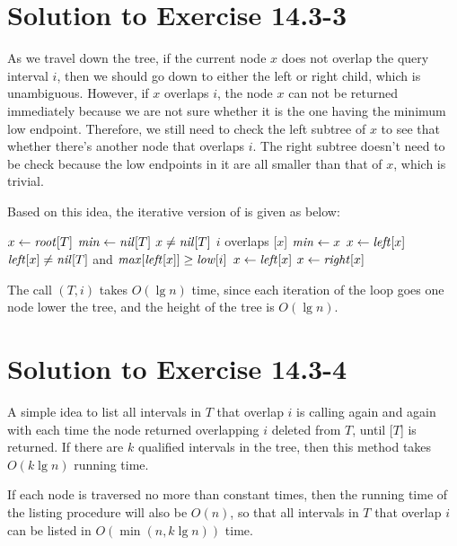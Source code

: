 \documentclass[a4paper, fleqn]{article}
\begin{document}
\section*{Solution to Exercise 14.3-3}

As we travel down the tree, if the current node $x$ does not overlap
the query interval $i$, then we should go down to either the left or
right child, which is unambiguous. However, if $x$ overlaps $i$, the
node $x$ can not be returned immediately because we are not sure
whether it is the one having the minimum low endpoint. Therefore, we
still need to check the left subtree of $x$ to see that whether
there's another node that overlaps $i$. The right subtree doesn't need
to be check because the low endpoints in it are all smaller than that
of $x$, which is trivial.

Based on this idea, the iterative version of
 is given as below:

\begin{codebox}
\li $x \gets \id{root}[T]$
\li $\id{min} \gets \id{nil}[T]$
\li \While $x \neq \id{nil}[T]$
\li   \Do
        \If $i$ overlaps [$x$]
\li       \Then
            $\id{min} \gets x$
\li         $x \gets \id{left}[x]$
\li     \ElseIf $\id{left}[x] \neq \id{nil}[T]$
            and $\id{max}[\id{left}[x]] \geq \id{low}[i]$
\li       \Then
            $x \gets \id{left}[x]$
\li     \ElseNoIf
            $x \gets \id{right}[x]$
        \End
      \End
\li \Return {}
\end{codebox}
The call $(T,i)$ takes $O(\lg n)$ time,
since each iteration of the  loop goes one node lower the
tree, and the height of the tree is $O(\lg n)$.






\section*{Solution to Exercise 14.3-4}

A simple idea to list all intervals in $T$ that overlap $i$ is calling
 again and again with each time the node
returned overlapping $i$ deleted from $T$, until [$T$] is
returned. If there are $k$ qualified intervals in the tree, then this
method takes $O(k \lg n)$ running time.

If each node is traversed no more than constant times, then the
running time of the listing procedure will also be $O(n)$, so that all
intervals in $T$ that overlap $i$ can be listed in $O(\min(n, k \lg
n))$ time.
\end{document}
